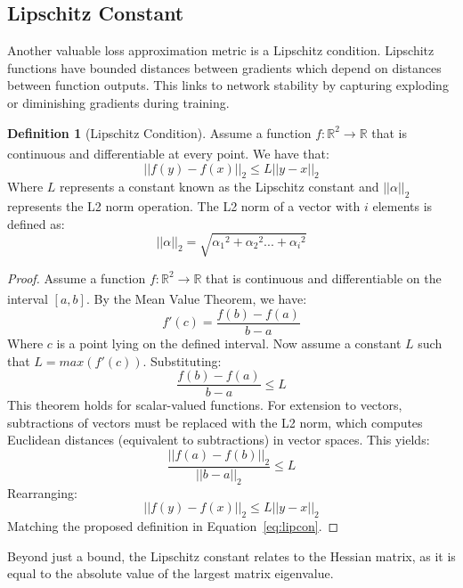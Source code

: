 \documentclass{article}
\theoremstyle{definition}
\newtheorem{definition}{Definition}[section]
\begin{document}
\subsection{Lipschitz Constant}
Another valuable loss approximation metric is a Lipschitz condition. Lipschitz functions have bounded distances between gradients which depend on distances between function outputs. This links to network stability by capturing exploding or diminishing gradients during training.
\begin{definition}[Lipschitz Condition]
    Assume a function $f : \mathbb{R}^2 \xrightarrow[]{} \mathbb{R}$ that is continuous and differentiable at every point. We have that:
    \begin{equation}
        \label{eq:lipcon}
        ||f(y) - f(x)||_2 \leq L ||y-x||_2
    \end{equation}
    Where $L$ represents a constant known as the Lipschitz constant and $||\alpha||_2$ represents the L2 norm operation. The L2 norm of a vector with $i$ elements is defined as:
    \[
        ||\alpha||_2 = \sqrt{{\alpha_1}^2 + {\alpha_2}^2 ... + {\alpha_i}^2}
    \]
\end{definition}
\begin{proof}
    Assume a function $f : \mathbb{R}^2 \xrightarrow[]{} \mathbb{R}$ that is continuous and differentiable on the interval $[a,b]$. By the Mean Value Theorem, we have:
    \[
        f'(c) = \frac{f(b)-f(a)}{b-a}
    \]
    Where $c$ is a point lying on the defined interval. Now assume a constant $L$ such that $L = max(f'(c))$. Substituting:
    \[
        \frac{f(b)-f(a)}{b-a} \leq L
    \]
    This theorem holds for scalar-valued functions. For extension to vectors, subtractions of vectors must be replaced with the L2 norm, which computes Euclidean distances (equivalent to subtractions) in vector spaces. This yields:
    \[
        \frac{||f(a)-f(b)||_2}{||b-a||_2} \leq L
    \]
    Rearranging:
    \[
        ||f(y) - f(x)||_2 \leq L ||y-x||_2 
    \]
    Matching the proposed definition in Equation~\ref{eq:lipcon}.
\end{proof}
Beyond just a bound, the Lipschitz constant relates to the Hessian matrix, as it is equal to the absolute value of the largest matrix eigenvalue.
\end{document}
